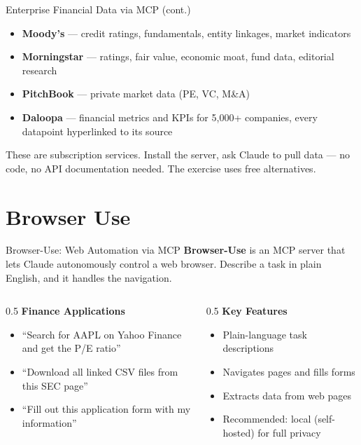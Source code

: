 \documentclass[aspectratio=169]{beamer}
\begin{document}
\begin{frame}{Enterprise Financial Data via MCP (cont.)}
\begin{itemize}
  \item \textbf{Moody's} --- credit ratings, fundamentals, entity linkages, market indicators
  \item \textbf{Morningstar} --- ratings, fair value, economic moat, fund data, editorial research
  \item \textbf{PitchBook} --- private market data (PE, VC, M\&A)
  \item \textbf{Daloopa} --- financial metrics and KPIs for 5,000+ companies, every datapoint hyperlinked to its source
\end{itemize}
\vspace{0.3cm}
These are subscription services.  Install the server, ask Claude to pull data --- \alert{no code, no API documentation needed}.  The exercise uses free alternatives.
\end{frame}

\section{Browser Use}

\begin{frame}{Browser-Use: Web Automation via MCP}
\textbf{Browser-Use} is an MCP server that lets Claude autonomously control a web browser. Describe a task in plain English, and it handles the navigation.
\vspace{0.3cm}
\begin{columns}[T]
\begin{column}{0.5\textwidth}
\textbf{Finance Applications}
\begin{itemize}\small
  \item ``Search for AAPL on Yahoo Finance and get the P/E ratio''
  \item ``Download all linked CSV files from this SEC page''
  \item ``Fill out this application form with my information''
\end{itemize}
\end{column}
\begin{column}{0.5\textwidth}
\textbf{Key Features}
\begin{itemize}\small
  \item Plain-language task descriptions
  \item Navigates pages and fills forms
  \item Extracts data from web pages
  \item \alert{Recommended}: local (self-hosted) for full privacy
\end{itemize}
\end{column}
\end{columns}
\end{frame}
\end{document}
